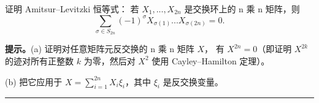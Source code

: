 \begin{exercise} 证明 Amitsur–Levitzki 恒等式：
若 $X_1,...,X_{2n}$ 是交换环上的 n 乘 n 矩阵，则
$$
\sum_{\sigma\in S_{2n}}
(-1)^\sigma X_{\sigma(1)}...X_{\sigma(2n)}=0.
$$

\textbf{提示。}(a) 证明对任意矩阵元反交换的 n 乘 n 矩阵 $X$，
有 $X^{2n}=0$（即证明 $X^{2k}$ 的迹对所有正整数
$k$ 为零，然后对 $X^2$ 使用 Cayley–Hamilton 定理）。

(b) 把它应用于 $X=\sum_{i=1}^{2n} X_i\xi_i$，其中 $\xi_i$ 是反交换变量。
\end{exercise}

\bigskip
\noindent\rule{\textwidth}{0.6pt}
